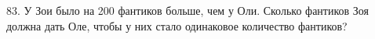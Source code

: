 83. У Зои было на 200 фантиков больше, чем у Оли. Сколько фантиков Зоя должна дать Оле, чтобы у них стало одинаковое количество фантиков?\\
